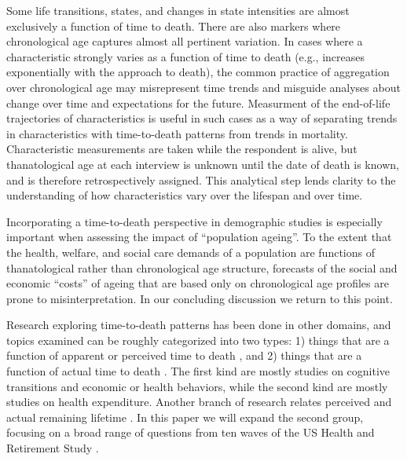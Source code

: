 \documentclass{article}
\begin{document}
Some life
transitions, states, and changes in state intensities are almost exclusively a
function of time to death. There are also markers where chronological age
captures almost all pertinent variation. In cases where a characteristic strongly varies as a
function of time to death (e.g., increases exponentially with the approach to death),
the common practice of aggregation over chronological age may misrepresent time
trends and misguide analyses about change over time and expectations for the
future. Measurment of the
end-of-life trajectories of characteristics is useful in such cases as a way of separating
trends in characteristics with time-to-death patterns from trends in mortality.
Characteristic measurements are taken while the respondent is alive, but
thanatological age at each interview is unknown until the date of death is
known, and is therefore retrospectively assigned. This analytical step lends clarity to the understanding of how characteristics vary over the lifespan and over time.

Incorporating a time-to-death perspective in demographic studies is especially
important when assessing the impact of ``population ageing''.
To the extent that the health, welfare, and social care demands of a
population are functions of thanatological rather than chronological age
structure, forecasts of the social and economic ``costs'' of ageing that are
based only on chronological age profiles are prone to misinterpretation.
In our concluding discussion we return to this point.

Research exploring time-to-death patterns has been done in other
domains, and topics examined can be roughly categorized into two types: 1) things that are a
function of apparent or perceived time to death
\citep{hamermesh1985expectations,hurd1995evaluation,carstensen2006influence,gan2004subjective,biro2010subjective,salm2010subjective,van2010living,cocco2012longevity,payne2013life,balia2013survival},
and 2) things that are a function of actual time to death
\citep{miller2001increasing,seshamani2004longitudinal,werblow2007population}.
The first kind are mostly studies on cognitive transitions and economic or
health behaviors, while the second kind are mostly studies on health
expenditure.
Another branch of research relates perceived and actual remaining lifetime
\citep{perozek2008using,delavande2011differential,post2012longevity,kutlu2013individuals}.
In this paper we will expand the second group, focusing on a broad range of
questions from ten waves of the US Health and Retirement Study \citep{HRS}.
\end{document}
